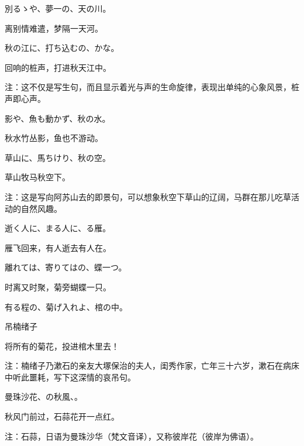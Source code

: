 \begin{haiku}
    {\FH 別るゝや、夢一の、天の川。}

    {\FK 离别情难遣，梦隔一天河。}
\end{haiku}

\begin{haiku}
    {\FH 秋の江に、打ち込むの、かな。}

    {\FK 回响的桩声，打进秋天江中。}

    {\FT 注：这不仅是写生句，而且显示着光与声的生命旋律，表现出单纯的心象风景，桩声即心声。}
\end{haiku}

\begin{haiku}
    {\FH {}影や、魚も動かず、秋の水。}

    {\FK 秋水竹丛影，鱼也不游动。}
\end{haiku}

\begin{haiku}
    {\FH 草山に、馬ちけり、秋の空。}

    {\FK 草山牧马秋空下。}

    {\FT 注：这是写向阿苏山去的即景句，可以想象秋空下草山的辽阔，马群在那儿吃草活动的自然风趣。}
\end{haiku}

\begin{haiku}
    {\FH 逝く人に、まる人に、る雁。}

    {\FK 雁飞回来，有人逝去有人在。}
\end{haiku}

\begin{haiku}
    {\FH 離れては、寄りてはの、蝶一つ。}

    {\FK 时离又时聚，菊旁蝴蝶一只。}
\end{haiku}

\begin{haiku}
    {\FH 有る程の、菊げ入れよ、棺の中。}

    {\FK 吊楠绪子}

    {\FK 将所有的菊花，投进棺木里去！}

    {\FT 注：楠绪子乃漱石的亲友大塚保治的夫人，闺秀作家，亡年三十六岁，漱石在病床中听此噩耗，写下这深情的哀吊句。}
\end{haiku}

\begin{haiku}
    {\FH 曼珠沙花、の秋風、。}

    {\FK 秋风门前过，石蒜花开一点红。}

    {\FT 注：石蒜，日语为曼珠沙华（梵文音译），又称彼岸花（彼岸为佛语）。}
\end{haiku}

